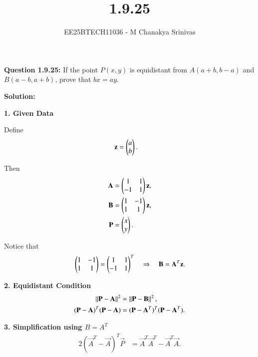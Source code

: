 \documentclass[journal]{IEEEtran}
\begin{document}

\vspace{3cm}

\title{1.9.25}
\author{EE25BTECH11036 - M Chanakya Srinivas}
\maketitle

\renewcommand{\thetable}{\theenumi}
\setlength{\intextsep}{10pt}
\renewcommand\theequation{\arabic{equation}}

\textbf{Question 1.9.25:}  
If the point $P(x,y)$ is equidistant from $A(a+b, b-a)$ and $B(a-b, a+b)$,  
prove that $bx = ay$.

\bigskip
\textbf{Solution:}

\medskip
\textbf{1. Given Data}  

Define
\begin{align}
\mathbf{z} &= \begin{pmatrix}a \\ b\end{pmatrix}. \label{eq:z-def}
\end{align}

Then
\begin{align}
\mathbf{A} &= \begin{pmatrix}1 & 1 \\ -1 & 1\end{pmatrix}\mathbf{z}, \label{eq:A-def} \\
\mathbf{B} &= \begin{pmatrix}1 & -1 \\ 1 & 1\end{pmatrix}\mathbf{z}, \label{eq:B-def} \\
\mathbf{P} &= \begin{pmatrix}x \\ y\end{pmatrix}. \label{eq:P-def}
\end{align}

Notice that
\begin{align}
\begin{pmatrix}1 & -1 \\ 1 & 1\end{pmatrix} 
= \begin{pmatrix}1 & 1 \\ -1 & 1\end{pmatrix}^T 
\quad \Rightarrow \quad 
\mathbf{B} = \mathbf{A}^T \mathbf{z}. \label{eq:B-ATz}
\end{align}

\medskip
\textbf{2. Equidistant Condition}
\begin{align}
\left\lVert\mathbf{P}-\mathbf{A}\right\rVert^2 &= \left\lVert\mathbf{P}-\mathbf{B}\right\rVert^2, \\
(\mathbf{P}-\mathbf{A})^T(\mathbf{P}-\mathbf{A}) &= (\mathbf{P}-\mathbf{A}^T)^T(\mathbf{P}-\mathbf{A}^T).
\end{align}

\medskip
\textbf{3. Simplification using $B=A^T$}
\begin{align}
2(\vec{A}^T - \vec{A})^T \vec{P} &= \vec{A}^{T}\vec{A}^{T} - \vec{A}^T\vec{A}.
\end{align}
\end{document}

